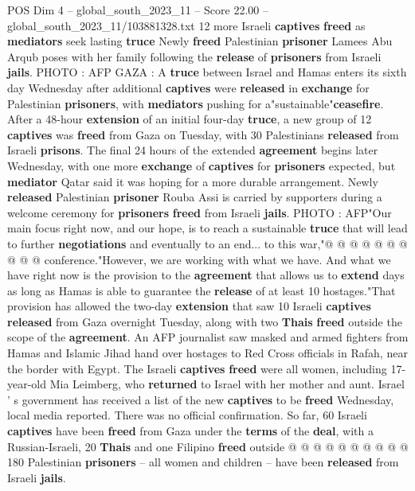 \begin{textsample}{POS Dim 4 – global\_south\_2023\_11 – Score 22.00 – global\_south\_2023\_11/103881328.txt}  \label{ex:f4_pos_162}
12 more Israeli \textbf{captives} \textbf{freed} as \textbf{mediators} seek lasting \textbf{truce} Newly \textbf{freed} Palestinian \textbf{prisoner} Lamees Abu Arqub poses with her family following the \textbf{release} of \textbf{prisoners} from Israeli \textbf{jails}.
PHOTO : AFP GAZA : A \textbf{truce} between Israel and Hamas enters its sixth day Wednesday after additional \textbf{captives} were \textbf{released} in \textbf{exchange} for Palestinian \textbf{prisoners}, with \textbf{mediators} pushing for a"sustainable"\textbf{ceasefire}.
After a 48-hour \textbf{extension} of an initial four-day \textbf{truce}, a new group of 12 \textbf{captives} was \textbf{freed} from Gaza on Tuesday, with 30 Palestinians \textbf{released} from Israeli \textbf{prisons}.
The final 24 hours of the extended \textbf{agreement} begins later Wednesday, with one more \textbf{exchange} of \textbf{captives} for \textbf{prisoners} expected, but \textbf{mediator} Qatar said it was hoping for a more durable arrangement.
Newly \textbf{released} Palestinian \textbf{prisoner} Rouba Assi is carried by supporters during a welcome ceremony for \textbf{prisoners} \textbf{freed} from Israeli \textbf{jails}.
PHOTO : AFP"Our main focus right now, and our hope, is to reach a sustainable \textbf{truce} that will lead to further \textbf{negotiations} and eventually to an end... to this war,"@ @ @ @ @ @ @ @ @ @ conference."However, we are working with what we have.
And what we have right now is the provision to the \textbf{agreement} that allows us to \textbf{extend} days as long as Hamas is able to guarantee the \textbf{release} of at least 10 hostages."That provision has allowed the two-day \textbf{extension} that saw 10 Israeli \textbf{captives} \textbf{released} from Gaza overnight Tuesday, along with two \textbf{Thais} \textbf{freed} outside the scope of the \textbf{agreement}.
An AFP journalist saw masked and armed fighters from Hamas and Islamic Jihad hand over hostages to Red Cross officials in Rafah, near the border with Egypt.
The Israeli \textbf{captives} \textbf{freed} were all women, including 17-year-old Mia Leimberg, who \textbf{returned} to Israel with her mother and aunt.
Israel ' s government has received a list of the new \textbf{captives} to be \textbf{freed} Wednesday, local media reported.
There was no official confirmation.
So far, 60 Israeli \textbf{captives} have been \textbf{freed} from Gaza under the \textbf{terms} of the \textbf{deal}, with a Russian-Israeli, 20 \textbf{Thais} and one Filipino \textbf{freed} outside @ @ @ @ @ @ @ @ @ @ 180 Palestinian \textbf{prisoners} -- all women and children -- have been \textbf{released} from Israeli \textbf{jails}.

\end{textsample}
